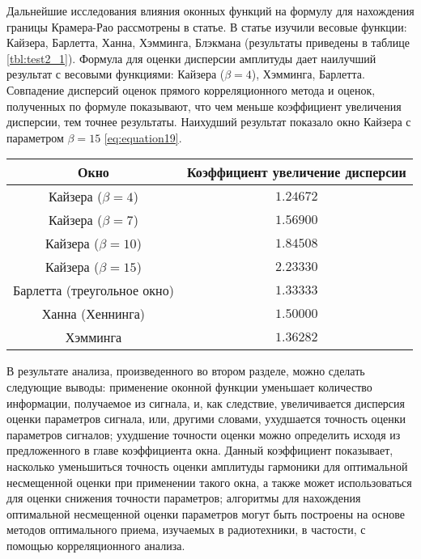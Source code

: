 Дальнейшие исследования влияния оконных функций на формулу для нахождения границы Крамера-Рао рассмотрены в статье. %
В статье изучили весовые функции: Кайзера, Барлетта, Ханна, Хэмминга, Блэкмана (результаты приведены в таблице \ref{tbl:test2_1}). Формула для оценки дисперсии амплитуды дает наилучший результат с весовыми функциями: Кайзера ($\beta=4$), Хэмминга, Барлетта. Совпадение дисперсий оценок прямого корреляционного метода и оценок, полученных по формуле показывают, что чем меньше коэффициент увеличения дисперсии, тем точнее результаты. Наихудший результат показало окно Кайзера с параметром $\beta=15$ \ref{eq:equation19}.
\begin{table}[ht]%
	\caption{Зависимость дисперсии оценки амплитуды от дисперсии шума.}
	\label{tbl:test2_1}
	\fontsize{10pt}{10pt}\selectfont
	\begin{longtable*}[c]{|c|c|}  
		\hline
		Окно &
		Коэффициент увеличение дисперсии  \\
		\hline			
		Кайзера ($\beta=4$) & $1.24672$ \\
		\hline
		Кайзера ($\beta=7$) & $1.56900$ \\
		\hline
		Кайзера ($\beta=10$) & $1.84508$ \\
		\hline
		Кайзера ($\beta=15$) & $2.23330$ \\
		\hline
		Барлетта (треугольное окно) & $1.33333$ \\
		\hline
		Ханна (Хеннинга) & $1.50000$ \\
		\hline 
		Хэмминга & $1.36282$ \\
		\hline
	\end{longtable*}%
\end{table}

В результате анализа, произведенного во втором разделе, можно сделать следующие выводы:
применение оконной функции уменьшает количество информации, получаемое из сигнала, и, как следствие, увеличивается дисперсия оценки параметров сигнала, или, другими словами, ухудшается точность оценки параметров сигналов;
ухудшение точности оценки можно определить исходя из предложенного в главе коэффициента окна. Данный коэффициент показывает, насколько уменьшиться точность оценки амплитуды гармоники для оптимальной несмещенной оценки при применении такого окна, а также может использоваться для оценки снижения точности параметров;
алгоритмы для нахождения оптимальной несмещенной оценки параметров могут быть построены на основе методов оптимального приема, изучаемых в радиотехники, в частости, с помощью корреляционного анализа.

